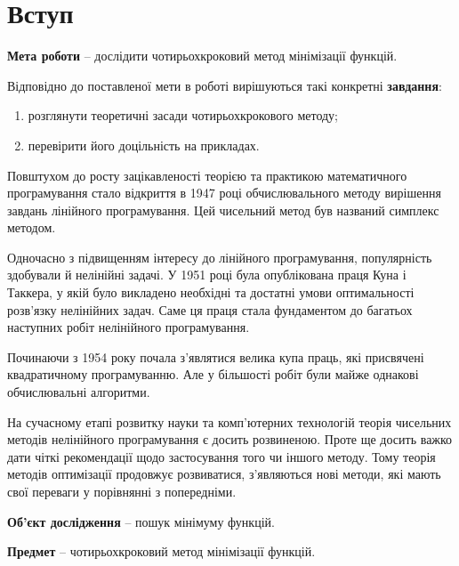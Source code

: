 \chapter*{Вступ}

\textbf{Мета роботи} – дослідити чотирьохкроковий метод мінімізації функцій.

Відповідно до поставленої мети в роботі вирішуються такі конкретні \textbf{завдання}:
\begin{enumerate}
	\item розглянути теоретичні засади чотирьохкрокового методу;
	\item перевірити його доцільність на прикладах.
\end{enumerate}

Повштухом до росту зацікавленості теорією та практикою математичного програмування стало відкриття в 1947 році обчислювального методу вирішення завдань лінійного програмування. Цей чисельний метод був названий симплекс методом.

Одночасно з підвищенням інтересу до лінійного програмування, популярність здобували й нелінійні задачі. У 1951 році була опублікована праця Куна і Таккера, у якій було викладено необхідні та достатні умови оптимальності розв'язку нелінійних задач. Саме ця праця стала фундаментом до багатьох наступних робіт нелінійного програмування. 

Починаючи з 1954 року почала з'являтися велика купа праць, які присвячені квадратичному програмуванню. Але у більшості робіт були майже однакові обчислювальні алгоритми.

На сучасному етапі розвитку науки та комп'ютерних технологій теорія чисельних методів нелінійного програмування є досить розвиненою. Проте ще досить важко дати чіткі рекомендації щодо застосування того чи іншого методу. Тому теорія методів оптимізації продовжує розвиватися, з'являються нові методи, які мають свої переваги у порівнянні з попередніми.

\textbf{Об'єкт дослідження} – пошук мінімуму функцій.

\textbf{Предмет} – чотирьохкроковий метод мінімізації функцій.



